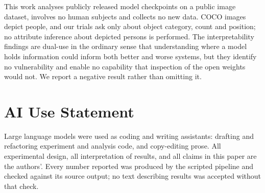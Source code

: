 This work analyses publicly released model checkpoints on a public image
dataset, involves no human subjects and collects no new data. COCO images depict
people, and our trials ask only about object category, count and position; no
attribute inference about depicted persons is performed. The interpretability
findings are dual-use in the ordinary sense that understanding where a model
holds information could inform both better and worse systems, but they identify
no vulnerability and enable no capability that inspection of the open weights
would not. We report a negative result rather than omitting it.

\section*{AI Use Statement}

Large language models were used as coding and writing assistants: drafting and
refactoring experiment and analysis code, and copy-editing prose. All
experimental design, all interpretation of results, and all claims in this paper
are the authors'. Every number reported was produced by the scripted pipeline
and checked against its source output; no text describing results was accepted
without that check.

